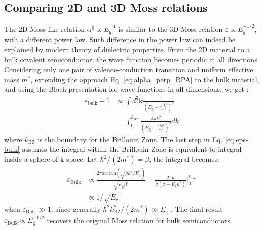 \documentclass[journal=ancac3,email=true,hyperref=true,keywords=false]{achemso}
\begin{document}
\subsection{Comparing 2D and 3D Moss relations}
\label{ssec:theory-2D}
The 2D Moss-like relation $\alpha^{\parallel} \propto E_{g}^{-1}$ is
similar to the 3D Moss relation $\varepsilon \propto E_{g}^{-1/2}$,
with a different power law. Such difference in the power law can
indeed be explained by modern theory of dielectric properties. From
the 2D material to a bulk covalent semiconductor, the wave function
becomes periodic in all directions. Considering only one pair of
valence-conduction transition and uniform effective mass $m^{*}$,
extending the approach Eq. \ref{eq:alpha_perp_RPA} to the bulk
material, and using the Bloch presentation for wave functions in all
dimensions, we get \cite{Jiang_2017_Eg_Eb}:
\begin{equation}
  \begin{aligned}
    \label{eq:eps-bulk}
    \varepsilon_{\mathrm{bulk}} - 1 &\propto \int d^{3}\mathbf{k}
    {\displaystyle \frac{1}{(E_{\mathrm{g}} + {\displaystyle
          \frac{\hbar^{2} k^{2}}{m^{*}}})^{2}}}\\
    &= \int_{0}^{k_{\mathrm{BZ}}} {\displaystyle
      \frac{4 \pi k^{2}}{(E_{\mathrm{g}} + {\displaystyle \frac{\hbar^{2}
            k^{2}}{m^{*}}})^{2}}} dk
  \end{aligned}
\end{equation}
where $k_{\mathrm{BZ}}$ is the boundary for the Brillouin Zone. The
last step in Eq. \ref{eq:eps-bulk} assumes the integral within the
Brillouin Zone is equivalent to integral inside a sphere of
k-space. Let $\hbar^{2}/(2 m^{*})=\beta$, the integral becomes:
\begin{equation}
  \begin{aligned}
    \label{eq:integral-BZ-bulk}
    \varepsilon_{\mathrm{Bulk}} &\propto {\displaystyle \frac{2 \pi
        \mathrm{arctan}(\sqrt{\beta k^{2}/E_{\mathrm{g}}})}{\sqrt{E_{\mathrm{g}} \beta^{3}}}
        - \frac{2\pi k}{\beta(\beta +E_{\mathrm{g}}k^{2})}
      } \bigg\rvert_{0}^{k_{\mathrm{BZ}}}\\
      &\propto 1/\sqrt{E_{\mathrm{g}}}
  \end{aligned}
\end{equation}
when $\varepsilon_{\mathrm{Bulk}} \gg 1$. since generally
$\hbar^{2}k_{\mathrm{BZ}}^{2}/(2m^{*}) \gg
E_{\mathrm{g}}$ \cite{Finkenrath_1988}. The final result $\varepsilon_{\mathrm{Bulk}} \propto E_{\mathrm{g}}^{-1/2}$ recovers the original Moss relation for bulk semiconductors.
\end{document}
